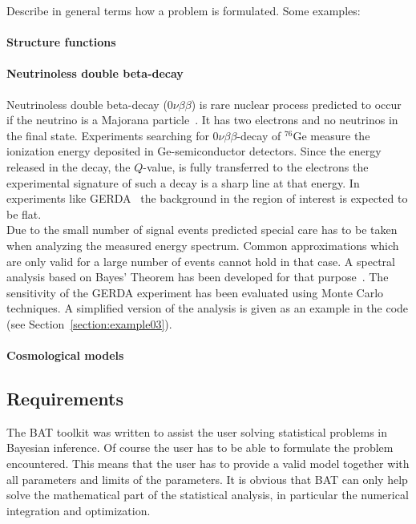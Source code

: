 \documentclass[11pt, a4paper]{article}
\begin{document}
Describe in general terms how a problem is formulated. Some examples:

\paragraph{Structure functions} 

\paragraph{Neutrinoless double beta-decay} 

Neutrinoless double beta-decay ($0\nu\beta\beta$) is rare nuclear
process predicted to occur if the neutrino is a Majorana
particle~\cite{Yao:2006px}. It has two electrons and no neutrinos in
the final state. Experiments searching for $0\nu\beta\beta$-decay of
$^{76}$Ge measure the ionization energy deposited in Ge-semiconductor
detectors. Since the energy released in the decay, the $Q$-value, is
fully transferred to the electrons the experimental signature of such
a decay is a sharp line at that energy. In experiments like
GERDA~\cite{Schonert:2005zn} the background in the region of interest
is expected to be flat. \\ 

\noindent 
Due to the small number of signal events predicted special care has to
be taken when analyzing the measured energy spectrum. Common
approximations which are only valid for a large number of events
cannot hold in that case. A spectral analysis based on Bayes' Theorem
has been developed for that purpose~\cite{Caldwell:2006yj}. The
sensitivity of the GERDA experiment has been evaluated using Monte
Carlo techniques. A simplified version of the analysis is given as an
example in the code (see Section~\ref{section:example03}). 

\paragraph{Cosmological models} 


\subsection{Requirements} 

The BAT toolkit was written to assist the user solving statistical
problems in Bayesian inference. Of course the user has to be able to
formulate the problem encountered. This means that the user has to
provide a valid model together with all parameters and limits of the
parameters. It is obvious that BAT can only help solve the
mathematical part of the statistical analysis, in particular the
numerical integration and optimization.  \\
\end{document}

